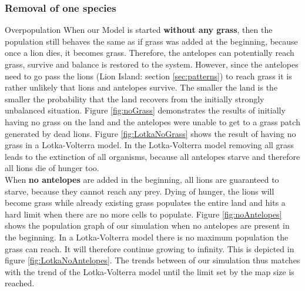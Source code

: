 \documentclass[11pt]{article}
\begin{document}
\subsubsection{Removal of one species}
\label{sec:DiscRemovalOfOne}
Overpopulation 
When our Model is started {\bf without any grass}, then the population still behaves the same as if grass was added at the beginning, because once a lion dies, it becomes grass. Therefore, the antelopes can potentially reach grass, survive and balance is restored to the system. However, since the antelopes need to go pass the lions (Lion Island: section \ref{sec:patterns}) to reach grass it is rather unlikely that lions and antelopes survive. The smaller the land is the smaller the probability that the land recovers from the initially strongly unbalanced situation. Figure \ref{fig:noGrass} demonstrates the results of initially having no grass on the land and the antelopes were unable to get to a grass patch generated by dead lions. Figure \ref{fig:LotkaNoGrass} shows the result of having no grass in a Lotka-Volterra model. In the Lotka-Volterra model removing all grass leads to the extinction of all organisms, because all antelopes starve and therefore all lions die of hunger too.\\

When {\bf no antelopes} are added in the beginning, all lions are guaranteed to starve, because they cannot reach any prey. Dying of hunger, the lions will become grass while already existing grass populates the entire land and hits a hard limit when there are no more cells to populate. Figure \ref{fig:noAntelopes} shows the population graph of our simulation when no antelopes are present in the beginning. In a Lotka-Volterra model there is no maximum population the grass can reach. It will therefore continue growing to infinity. This is depicted in figure \ref{fig:LotkaNoAntelopes}. The trends between of our simulation thus matches with the trend of the Lotka-Volterra model until the limit set by the map size is reached.\\
\end{document}
